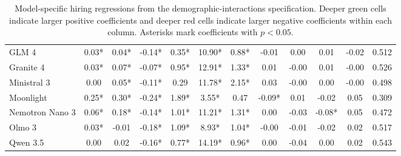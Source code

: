 \begin{table}[p]
\begin{tabular}{lccccccccccr}
GLM 4 & \cellcolor[HTML]{E5F7EE}0.03* & \cellcolor[HTML]{E1F6EB}0.04* & \cellcolor[HTML]{F19990}-0.14* & \cellcolor[HTML]{D8F3E5}0.35* & \cellcolor[HTML]{5ECD93}10.90* & \cellcolor[HTML]{B1E7CB}0.88* & \cellcolor[HTML]{FDEEEC}-0.01 & \cellcolor[HTML]{FDFEFE}0.00 & \cellcolor[HTML]{F2FBF6}0.01 & \cellcolor[HTML]{FBE1DE}-0.02 & 0.512 \\
Granite 4 & \cellcolor[HTML]{E3F6EC}0.03* & \cellcolor[HTML]{CDEFDD}0.07* & \cellcolor[HTML]{F8C8C3}-0.07* & \cellcolor[HTML]{96DEB9}0.95* & \cellcolor[HTML]{41C480}12.91* & \cellcolor[HTML]{89DAB0}1.33* & \cellcolor[HTML]{ECF9F2}0.01 & \cellcolor[HTML]{FFFEFE}-0.00 & \cellcolor[HTML]{F7FCF9}0.01 & \cellcolor[HTML]{FFFBFB}-0.00 & 0.526 \\
Ministral 3 & \cellcolor[HTML]{FBFEFC}0.00 & \cellcolor[HTML]{D9F3E5}0.05* & \cellcolor[HTML]{F4B0A9}-0.11* & \cellcolor[HTML]{DFF5E9}0.29 & \cellcolor[HTML]{51C98B}11.78* & \cellcolor[HTML]{40C47F}2.15* & \cellcolor[HTML]{CFF0DF}0.03 & \cellcolor[HTML]{FFFFFF}-0.00 & \cellcolor[HTML]{FEFFFE}0.00 & \cellcolor[HTML]{FFFCFB}-0.00 & 0.498 \\
Moonlight & \cellcolor[HTML]{2EBE73}0.25* & \cellcolor[HTML]{2EBE73}0.30* & \cellcolor[HTML]{E74C3C}-0.24* & \cellcolor[HTML]{2EBE73}1.89* & \cellcolor[HTML]{CBEFDC}3.55* & \cellcolor[HTML]{D5F2E3}0.47 & \cellcolor[HTML]{ED786C}-0.09* & \cellcolor[HTML]{F5FCF8}0.01 & \cellcolor[HTML]{FDEFED}-0.02 & \cellcolor[HTML]{A4E3C2}0.05 & 0.309 \\
Nemotron Nano 3 & \cellcolor[HTML]{CCEFDD}0.06* & \cellcolor[HTML]{7FD7A9}0.18* & \cellcolor[HTML]{F1968C}-0.14* & \cellcolor[HTML]{8FDCB4}1.01* & \cellcolor[HTML]{5ACC90}11.21* & \cellcolor[HTML]{8BDBB1}1.31* & \cellcolor[HTML]{FEFFFF}0.00 & \cellcolor[HTML]{FBE5E2}-0.03 & \cellcolor[HTML]{F7C0BB}-0.08* & \cellcolor[HTML]{9EE1BE}0.05 & 0.472 \\
Olmo 3 & \cellcolor[HTML]{E3F6EC}0.03* & \cellcolor[HTML]{FEF7F6}-0.01 & \cellcolor[HTML]{ED7A6E}-0.18* & \cellcolor[HTML]{86D9AE}1.09* & \cellcolor[HTML]{7BD6A7}8.93* & \cellcolor[HTML]{A3E2C1}1.04* & \cellcolor[HTML]{FFFDFD}-0.00 & \cellcolor[HTML]{FEF5F4}-0.01 & \cellcolor[HTML]{FDEFED}-0.02 & \cellcolor[HTML]{D5F2E3}0.02 & 0.517 \\
Qwen 3.5 & \cellcolor[HTML]{FCFEFD}0.00 & \cellcolor[HTML]{EFFAF4}0.02 & \cellcolor[HTML]{EF867B}-0.16* & \cellcolor[HTML]{A9E4C6}0.77* & \cellcolor[HTML]{2EBE73}14.19* & \cellcolor[HTML]{AAE5C6}0.96* & \cellcolor[HTML]{FCFEFD}0.00 & \cellcolor[HTML]{FADCD9}-0.04 & \cellcolor[HTML]{FBFEFC}0.00 & \cellcolor[HTML]{D5F2E3}0.02 & 0.543 \\
\hline
\end{tabular}
\caption{Model-specific hiring regressions from the demographic-interactions specification. Deeper green cells indicate larger positive coefficients and deeper red cells indicate larger negative coefficients within each column. Asterisks mark coefficients with $p < 0.05$.}
\label{tab:appendix-model-specific-regressions-interactions}
\end{table}
